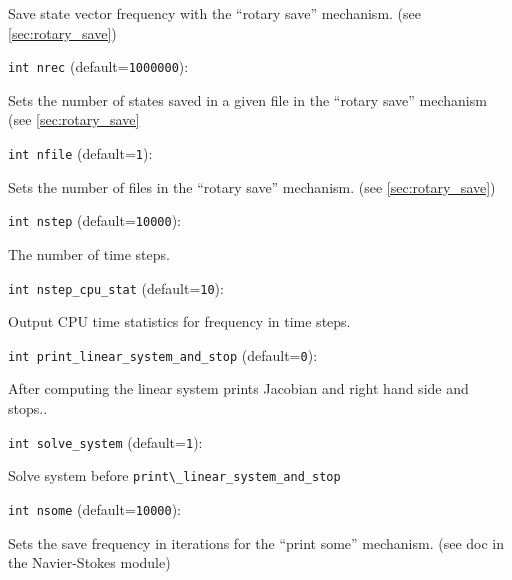 Save state vector frequency with the ``rotary save''
mechanism. (see \ref{sec:rotary_save})

\item\verb+int nrec+ {\rm(default=\verb|1000000|)}:

Sets the number of states saved in a given file
in the ``rotary save'' mechanism (see \ref{sec:rotary_save}

\item\verb+int nfile+ {\rm(default=\verb|1|)}:

Sets the number of files in the ``rotary save'' mechanism. 
(see \ref{sec:rotary_save})

\item\verb+int nstep+ {\rm(default=\verb|10000|)}:

The number of time steps. 

\item\verb+int nstep_cpu_stat+ {\rm(default=\verb|10|)}:

Output CPU time statistics for frequency in time steps. 

\item\verb+int print_linear_system_and_stop+ {\rm(default=\verb|0|)}:

After computing the linear system prints Jacobian and
right hand side and stops.. 

\item\verb+int solve_system+ {\rm(default=\verb|1|)}:

Solve system before \verb+print\_linear_system_and_stop+

\item\verb+int nsome+ {\rm(default=\verb|10000|)}:

Sets the save frequency in iterations for the ``print some''
mechanism. (see doc in the Navier-Stokes module)

